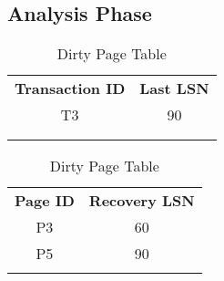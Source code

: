 \subsection{Analysis Phase}
\begin{table}[H]
    \begin{minipage}{.5\linewidth}
      \centering
		\begin{tabular}{|c|c|}
		\cline{1-2}
		\textbf{Transaction ID} & \textbf{Last LSN} \\ \cline{1-2}
		T3             & 90       \\ \cline{1-2}
		               &          \\ \cline{1-2}
		               &          \\ \cline{1-2}
		\end{tabular}
      \caption{Transaction Table}

    \end{minipage}%
    \begin{minipage}{.5\linewidth}
      \centering
		\begin{tabular}{|c|c|}
		\cline{1-2}
		\textbf{Page ID} & \textbf{Recovery LSN} \\ \cline{1-2}
		P3      & 60           \\ \cline{1-2}
		P5      & 90           \\ \cline{1-2}
		        &              \\ \cline{1-2}
		\end{tabular}
        \caption{Dirty Page Table}

    \end{minipage} 
\end{table}


